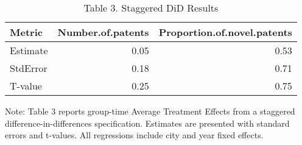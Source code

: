 \documentclass[12pt]{article}
\begin{document}
\begin{table}[ht]
\centering
\caption*{Table 3. Staggered DiD Results} 
\begin{tabular}{lrr}
  \hline
Metric & Number.of.patents & Proportion.of.novel.patents \\ 
  \hline
Estimate & 0.05 & 0.53 \\ 
  StdError & 0.18 & 0.71 \\ 
  T-value & 0.25 & 0.75 \\ 
   \hline
\end{tabular}
\label{tab:stag_did}
\end{table}

\bigskip
\noindent\footnotesize Note: Table 3 reports group-time Average Treatment Effects from a staggered difference-in-differences specification. Estimates are presented with standard errors and t-values. All regressions include city and year fixed effects.
\end{document}
